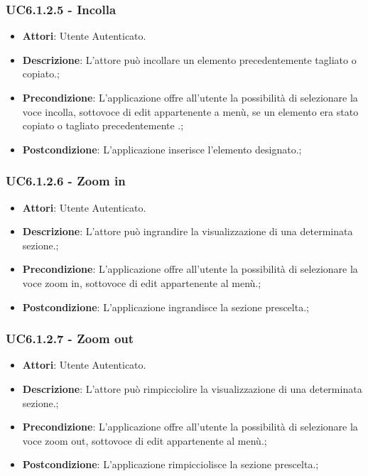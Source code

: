 \subsubsection{UC6.1.2.5 - Incolla} 
\label{sssec:UC6.1.2.5} 
\begin{itemize} 
\item \textbf{Attori}: Utente Autenticato.
\item \textbf{Descrizione}: L’attore può incollare un elemento precedentemente
tagliato o copiato.;
\item \textbf{Precondizione}: L’applicazione offre all’utente la possibilità di selezionare la voce
incolla, sottovoce di edit appartenente a menù, se un elemento era stato copiato o
tagliato precedentemente .;
\item \textbf{Postcondizione}: L’applicazione inserisce l’elemento designato.;
\end{itemize} 
\subsubsection{UC6.1.2.6 - Zoom in} 
\label{sssec:UC6.1.2.6} 
\begin{itemize} 
\item \textbf{Attori}: Utente Autenticato.
\item \textbf{Descrizione}: L’attore può ingrandire la visualizzazione di
una determinata sezione.;
\item \textbf{Precondizione}: L’applicazione offre all’utente la possibilità di selezionare la voce
zoom in, sottovoce di edit appartenente al menù.;
\item \textbf{Postcondizione}: L’applicazione ingrandisce la sezione prescelta.;
\end{itemize} 
\subsubsection{UC6.1.2.7 - Zoom out} 
\label{sssec:UC6.1.2.7} 
\begin{itemize} 
\item \textbf{Attori}: Utente Autenticato.
\item \textbf{Descrizione}: L’attore può rimpicciolire la visualizzazione di
una determinata sezione.;
\item \textbf{Precondizione}: L’applicazione offre all’utente la possibilità di selezionare la voce
zoom out, sottovoce di edit appartenente al menù.;
\item \textbf{Postcondizione}: L’applicazione rimpicciolisce la sezione prescelta.;
\end{itemize} 
